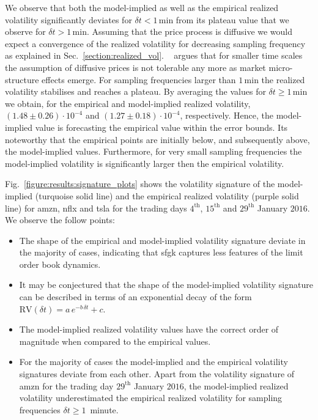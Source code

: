 \documentclass[11pt, a4paper]{thesis}  %
\begin{document}
We observe that both the model-implied as well as the empirical realized volatility significantly deviates for $\delta t<1\,\textrm{min}$ from its plateau value that we observe for $\delta t>1\,\textrm{min}$. Assuming that the price process is diffusive we would expect a convergence of the realized volatility for decreasing sampling frequency as explained in Sec.~\ref{section:realized_vol}. \citeauthor{Anderson:2000:GreatRealisations}~\citep{Anderson:2000:GreatRealisations} argues that for smaller time scales the assumption of diffusive prices is not tolerable any more as market micro-structure effects emerge. For sampling frequencies larger than $1\,$min the realized volatility stabilises and reaches a plateau. By averaging the values for $\delta t \ge 1\,$min we obtain, for the empirical and model-implied realized volatility, $(1.48\pm 0.26)\cdot 10^{-4}$ and $(1.27\pm 0.18)\cdot 10^{-4}$, respectively. Hence, the model-implied value is forecasting the empirical value within the error bounds. Its noteworthy that the empirical points are initially below, and subsequently above, the model-implied values. Furthermore, for very small sampling frequencies the model-implied volatility is significantly larger then the empirical volatility.

%
Fig.~\ref{figure:results:signature_plots} shows the volatility signature of the model-implied (turquoise solid line) and the empirical realized volatility (purple solid line) for \ac{amzn}, \ac{nflx} and \ac{tsla} for the trading days $4^\textrm{th}$, $15^\textrm{th}$ and $29^\textrm{th}$ January $2016$. We observe the follow points: 

\begin{itemize}

	\item The shape of the empirical and model-implied volatility signature deviate in the majority of cases, indicating that \ac{sfgk} captures less features of the limit order book dynamics.
	
	\item It may be conjectured that the shape of the model-implied volatility signature can be described in terms of an exponential decay of the form $\textrm{RV}(\delta t) = a\,e^{-b\,\delta t}+c$.
	
	\item The model-implied realized volatility values have the correct order of magnitude when compared to the empirical values.
	
	\item For the majority of cases the model-implied and the empirical volatility signatures deviate from each other. Apart from the volatility signature of \ac{amzn} for the trading day $29^\textrm{th}$ January $2016$, the model-implied realized volatility underestimated the empirical realized volatility for sampling frequencies $\delta t  \ge 1\,$ minute.
		
\end{itemize}
\end{document}
